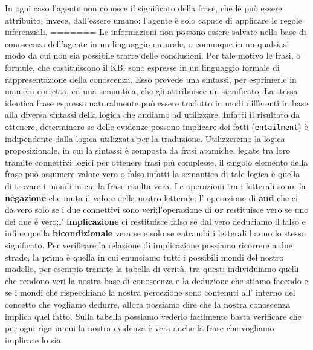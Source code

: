 		In ogni caso l'agente non conosce il significato della frase, che le può essere attribuito, invece, dall'essere umano: l'agente è solo capace di applicare le regole inferenziali.
=======
		Le informazioni non possono essere salvate nella base di conoscenza dell'agente in un linguaggio naturale, o comunque in un qualsiasi modo da cui non sia possibile trarre delle conclusioni. Per tale motivo le frasi, o formule, che costituiscono il KB, sono espresse in un linguaggio formale di rappresentazione della conoscenza. Esso prevede una sintassi, per esprimerle in maniera corretta, ed una semantica, che gli attribuisce un significato. %
		La stessa identica frase espressa naturalmente può essere tradotto in modi differenti in base alla diversa sintassi della logica che andiamo ad utilizzare. Infatti il risultato da ottenere, determinare se delle evidenze possono implicare dei fatti (\texttt{entailment}) è indipendente dalla logica utilizzata per la traduzione.
		Utilizzeremo la logica proposizionale, in cui la sintassi è composta da frasi atomiche, legate tra loro tramite connettivi logici per ottenere frasi più complesse, il singolo elemento della frase può assumere valore vero o falso,infatti la semantica di tale logica è quella di trovare i mondi in cui la frase risulta vera. Le operazioni tra i letterali sono: la \textbf{negazione} che muta il valore della nostro letterale; l' operazione di \textbf{and} che ci da vero solo se i due connettivi sono veri;l'operazione di \textbf{or} restituisce vero se uno dei due è vero;l' \textbf{implicazione} ci restituisce falso se dal vero deduciamo il falso e infine quella \textbf{bicondizionale} vera se e solo se entrambi i letterali hanno lo stesso significato.
		Per verificare la relazione di implicazione possiamo ricorrere a due strade, la prima è quella in cui enunciamo tutti i possibili mondi del nostro modello, per esempio tramite la tabella di verità, tra questi individuiamo quelli che rendono veri la nostra base di conoscenza e la deduzione che stiamo facendo e se i mondi che rispecchiano la nostra percezione sono contenuti all' interno del concetto che vogliamo dedurre, allora possiamo dire che la nostra conoscenza implica quel fatto.
		Sulla tabella possiamo vederlo facilmente basta verificare che per ogni riga in cui la nostra evidenza è vera anche la frase che vogliamo implicare lo sia.
